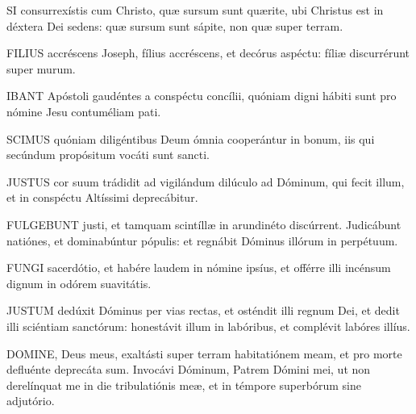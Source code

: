 \lettrine[lines=2]{S}{I} consurrexístis cum Christo, quæ sursum sunt quærite, ubi Christus est in déxtera Dei sedens: quæ sursum sunt sápite, non quæ super terram.



\lettrine[lines=2]{F}{ILIUS} accréscens Joseph, fílius accréscens, et decórus aspéctu: fíliæ discurrérunt super murum.



\lettrine[lines=2]{I}{BANT} Apóstoli gaudéntes a conspéctu concílii, quóniam digni hábiti sunt pro nómine Jesu contuméliam pati.


\lettrine[lines=2]{S}{CIMUS} quóniam diligéntibus Deum ómnia cooperántur in bonum, iis qui secúndum propósitum vocáti sunt sancti.


\lettrine[lines=2]{J}{USTUS} cor suum trádidit ad vigilándum dilúculo ad Dóminum, qui fecit illum, et in conspéctu Altíssimi deprecábitur.


\lettrine[lines=2]{F}{ULGEBUNT} justi, et tamquam scintíllæ in arundinéto discúrrent. Judicábunt natiónes, et dominabúntur pópulis: et regnábit Dóminus illórum in perpétuum.


\lettrine[lines=2]{F}{UNGI} sacerdótio, et habére laudem in nómine ipsíus, et offérre illi incénsum dignum in odórem suavitátis.


\lettrine[lines=2]{J}{USTUM} dedúxit Dóminus per vias rectas, et osténdit illi regnum Dei, et dedit illi sciéntiam sanctórum: honestávit illum in labóribus, et complévit labóres illíus.


\lettrine[lines=2]{D}{OMINE}, Deus meus, exaltásti super terram habitatiónem meam, et pro morte defluénte deprecáta sum. Invocávi Dóminum, Patrem Dómini mei, ut non derelínquat me in die tribulatiónis meæ, et in témpore superbórum sine adjutório.


